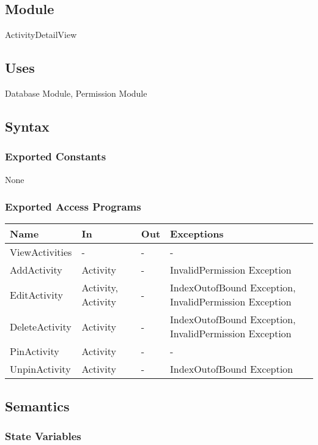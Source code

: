 \documentclass[12pt, titlepage]{article}
\begin{document}
\subsection{Module}

ActivityDetailView

\subsection{Uses}

Database Module, Permission Module

\subsection{Syntax}

\subsubsection{Exported Constants}

None

\subsubsection{Exported Access Programs}
\begin{center}
\begin{tabular}{p{4cm} p{2cm} p{4cm} p{4cm}}
\hline
\textbf{Name} & \textbf{In} & \textbf{Out} & \textbf{Exceptions} \\
\hline
ViewActivities & - & - & - \\
AddActivity & Activity & - & InvalidPermission Exception \\
EditActivity & Activity, Activity & - & IndexOutofBound Exception, InvalidPermission Exception \\
DeleteActivity & Activity & - & IndexOutofBound Exception, InvalidPermission Exception \\
PinActivity & Activity & - & - \\
UnpinActivity & Activity & - & IndexOutofBound Exception \\
\hline
\end{tabular}
\end{center}

\subsection{Semantics}

\subsubsection{State Variables}
\end{document}
